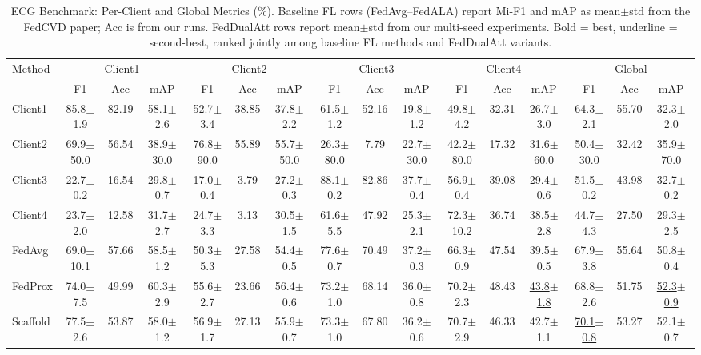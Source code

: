 \documentclass[a4paper]{article}
\begin{document}
\begin{table}[htbp]
  \centering
  \caption{ECG Benchmark: Per-Client and Global Metrics (\%). Baseline FL rows (FedAvg--FedALA) report Mi-F1 and mAP as mean$\pm$std from the FedCVD paper; Acc is from our runs. FedDualAtt rows report mean$\pm$std from our multi-seed experiments. Bold = best, underline = second-best, ranked jointly among baseline FL methods and FedDualAtt variants.}
  \begin{adjustbox}{max width=\linewidth}
  \begin{tabular}{l|ccc|ccc|ccc|ccc|ccc}
    \toprule
    \multirow{2}{*}{Method} & \multicolumn{3}{c|}{Client1} & \multicolumn{3}{c|}{Client2} & \multicolumn{3}{c|}{Client3} & \multicolumn{3}{c|}{Client4} & \multicolumn{3}{c}{Global} \\
    & F1 & Acc & mAP & F1 & Acc & mAP & F1 & Acc & mAP & F1 & Acc & mAP & F1 & Acc & mAP \\
    \midrule
    Client1 & 85.8$\pm$1.9 & 82.19 & 58.1$\pm$2.6 & 52.7$\pm$3.4 & 38.85 & 37.8$\pm$2.2 & 61.5$\pm$1.2 & 52.16 & 19.8$\pm$1.2 & 49.8$\pm$4.2 & 32.31 & 26.7$\pm$3.0 & 64.3$\pm$2.1 & 55.70 & 32.3$\pm$2.0 \\
    Client2 & 69.9$\pm$50.0 & 56.54 & 38.9$\pm$30.0 & 76.8$\pm$90.0 & 55.89 & 55.7$\pm$50.0 & 26.3$\pm$80.0 & 7.79 & 22.7$\pm$30.0 & 42.2$\pm$80.0 & 17.32 & 31.6$\pm$60.0 & 50.4$\pm$30.0 & 32.42 & 35.9$\pm$70.0 \\
    Client3 & 22.7$\pm$0.2 & 16.54 & 29.8$\pm$0.7 & 17.0$\pm$0.4 & 3.79 & 27.2$\pm$0.3 & 88.1$\pm$0.2 & 82.86 & 37.7$\pm$0.4 & 56.9$\pm$0.4 & 39.08 & 29.4$\pm$0.6 & 51.5$\pm$0.2 & 43.98 & 32.7$\pm$0.2 \\
    Client4 & 23.7$\pm$2.0 & 12.58 & 31.7$\pm$2.7 & 24.7$\pm$3.3 & 3.13 & 30.5$\pm$1.5 & 61.6$\pm$5.5 & 47.92 & 25.3$\pm$2.1 & 72.3$\pm$10.2 & 36.74 & 38.5$\pm$2.8 & 44.7$\pm$4.3 & 27.50 & 29.3$\pm$2.5 \\
    \midrule
    FedAvg  & 69.0$\pm$10.1 & 57.66 & 58.5$\pm$1.2 & 50.3$\pm$5.3 & 27.58 & 54.4$\pm$0.5 & 77.6$\pm$0.7 & 70.49 & 37.2$\pm$0.3 & 66.3$\pm$0.9 & 47.54 & 39.5$\pm$0.5 & 67.9$\pm$3.8 & 55.64 & 50.8$\pm$0.4 \\
    FedProx & 74.0$\pm$7.5 & 49.99 & 60.3$\pm$2.9 & 55.6$\pm$2.7 & 23.66 & 56.4$\pm$0.6 & 73.2$\pm$1.0 & 68.14 & 36.0$\pm$0.8 & 70.2$\pm$2.3 & 48.43 & \underline{43.8$\pm$1.8} & 68.8$\pm$2.6 & 51.75 & \underline{52.3$\pm$0.9} \\
    Scaffold & 77.5$\pm$2.6 & 53.87 & 58.0$\pm$1.2 & 56.9$\pm$1.7 & 27.13 & 55.9$\pm$0.7 & 73.3$\pm$1.0 & 67.80 & 36.2$\pm$0.6 & 70.7$\pm$2.9 & 46.33 & 42.7$\pm$1.1 & \underline{70.1$\pm$0.8} & 53.27 & 52.1$\pm$0.7 \\

\end{tabular}
\end{adjustbox}
\end{table}
\end{document}
